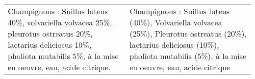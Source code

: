 \begin{tabular}{p{7cm}p{7cm}}
                                                                                                                                                                                                                                                                                                                                                                                                                                                                                                                                                                                                                                                                                                                                                                                                                                                                                                                                                                                                                                                                                                                                                                                                                                                                                                                                                                                                                                                                                                                                     Champignons : Suillus luteus 40\%, volvariella volvacea 25\%, pleurotus ostreatus 20\%, lactarius deliciosus 10\%, pholiota mutabilis 5\%, à la mise en oeuvre, eau, acide citrique. &                                                                                                                                                                                                                                                                                                                                                                     Champignons : Suillus luteus (40\%), Volvariella volvacea (25\%), Pleurotus ostreatus (20\%), lactarius deliciosus (10\%), pholiota mutabilis (5\%), à la mise en oeuvre, eau, acide citrique \\

\end{tabular}
